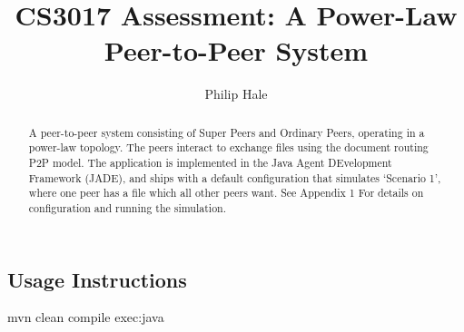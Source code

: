 \documentclass[a4paper,oneside]{article}
\author{Philip Hale}
\title{CS3017 Assessment: A Power-Law Peer-to-Peer System}
\begin{document}
\begin{titlepage}
  \maketitle
  \begin{abstract}
  A peer-to-peer system consisting of Super Peers and Ordinary Peers, operating
  in a power-law topology. The peers interact to exchange files using the
  document routing P2P model. The application is implemented in the Java Agent
  DEvelopment Framework (JADE), and ships with a default configuration that
  simulates `Scenario 1', where one peer has a file which all other peers want.
  See Appendix 1 For details on configuration and running the simulation.
  \end{abstract}
  \dosecttoc
  \tableofcontents
\end{titlepage}





\begin{appendices}
  \section{Usage Instructions}
  mvn clean compile exec:java
\end{appendices}
\end{document}
